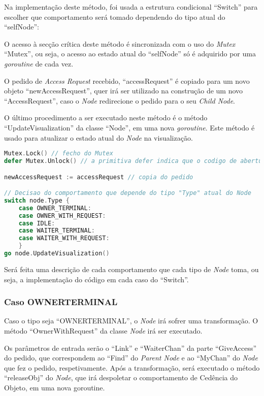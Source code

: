 Na implementação deste método, foi usada a estrutura condicional ``Switch'' para escolher que comportamento será tomado dependendo do tipo atual do ``selfNode'':

O acesso à secção crítica deste método é sincronizada com o uso do \emph{Mutex} ``Mutex'', ou seja, o acesso ao estado atual do ``selfNode'' só é adquirido por uma \emph{goroutine} de cada vez.

O pedido de \emph{Access Request} recebido, ``accessRequest'' é copiado para um novo objeto ``newAccessRequest'', quer irá ser utilizado na construção de um novo ``AccessRequest'', caso o \emph{Node} redirecione o pedido para o seu \emph{Child Node}.

O último procedimento a ser executado neste método é o método ``UpdateVisualization'' da classe ``Node'', em uma nova \emph{goroutine}.
Este método é usado para atualizar o estado atual do \emph{Node} na visualização.

\begin{lstlisting}[caption={\emph{Switch} de decisão do comportamento.},language=Go]
Mutex.Lock() // fecho do Mutex
defer Mutex.Unlock() // a primitiva defer indica que o codigo de abertura do Mutex sera corrido caso a execucao deste metodo termine

newAccessRequest := accessRequest // copia do pedido

// Decisao do comportamento que depende do tipo "Type" atual do Node
switch node.Type {
	case OWNER_TERMINAL:
	case OWNER_WITH_REQUEST:
	case IDLE:
	case WAITER_TERMINAL:
	case WAITER_WITH_REQUEST:
	}
go node.UpdateVisualization()
\end{lstlisting}

Será feita uma descrição de cada comportamento que cada tipo de \emph{Node} toma, ou seja, a implementação do código em cada caso do ``Switch''.

\subsubsection*{Caso OWNER\textunderscore TERMINAL}
Caso o tipo seja ``OWNER\textunderscore TERMINAL'', o \emph{Node} irá sofrer uma transformação. O método ``OwnerWithRequest'' da classe \emph{Node} irá ser executado.

Os parâmetros de entrada serão o ``Link'' e ``WaiterChan'' da parte ``GiveAccess'' do pedido, que correspondem ao ``Find'' do \emph{Parent Node} e ao ``MyChan'' do \emph{Node} que fez o pedido, respetivamente.
Após a transformação, será executado o método ``releaseObj'' do \emph{Node}, que irá despoletar o comportamento de Cedência do Objeto, em uma nova \emph{}{goroutine}.


